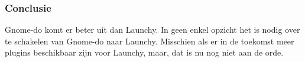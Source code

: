 \documentclass[12pt]{article} %
\begin{document}
\subsubsection{Conclusie}
Gnome-do komt er beter uit dan Launchy. In geen enkel opzicht het is nodig over te schakelen van Gnome-do naar Launchy. Misschien als er in de toekomst meer plugins beschikbaar zijn voor Launchy, maar, dat is nu nog niet aan de orde. \cite{fosswire}




\newpage %




\end{document}
